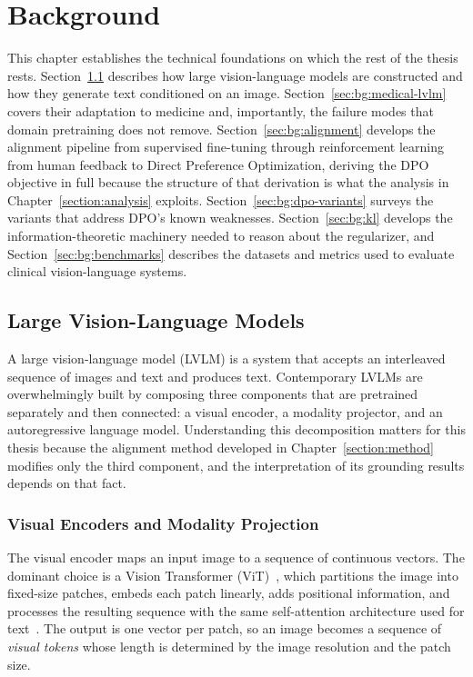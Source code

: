 \section{Background}
\label{section:background}

This chapter establishes the technical foundations on which the rest of the thesis rests. Section~\ref{sec:bg:lvlm} describes how large vision-language models are constructed and how they generate text conditioned on an image. Section~\ref{sec:bg:medical-lvlm} covers their adaptation to medicine and, importantly, the failure modes that domain pretraining does not remove. Section~\ref{sec:bg:alignment} develops the alignment pipeline from supervised fine-tuning through reinforcement learning from human feedback to Direct Preference Optimization, deriving the DPO objective in full because the structure of that derivation is what the analysis in Chapter~\ref{section:analysis} exploits. Section~\ref{sec:bg:dpo-variants} surveys the variants that address DPO's known weaknesses. Section~\ref{sec:bg:kl} develops the information-theoretic machinery needed to reason about the regularizer, and Section~\ref{sec:bg:benchmarks} describes the datasets and metrics used to evaluate clinical vision-language systems.

\subsection{Large Vision-Language Models}
\label{sec:bg:lvlm}

A large vision-language model (LVLM) is a system that accepts an interleaved sequence of images and text and produces text. Contemporary LVLMs are overwhelmingly built by composing three components that are pretrained separately and then connected: a visual encoder, a modality projector, and an autoregressive language model. Understanding this decomposition matters for this thesis because the alignment method developed in Chapter~\ref{section:method} modifies only the third component, and the interpretation of its grounding results depends on that fact.

\subsubsection{Visual Encoders and Modality Projection}

The visual encoder maps an input image to a sequence of continuous vectors. The dominant choice is a Vision Transformer (ViT)~\cite{dosovitskiy2021image}, which partitions the image into fixed-size patches, embeds each patch linearly, adds positional information, and processes the resulting sequence with the same self-attention architecture used for text~\cite{vaswani2017attention}. The output is one vector per patch, so an image becomes a sequence of \emph{visual tokens} whose length is determined by the image resolution and the patch size.

